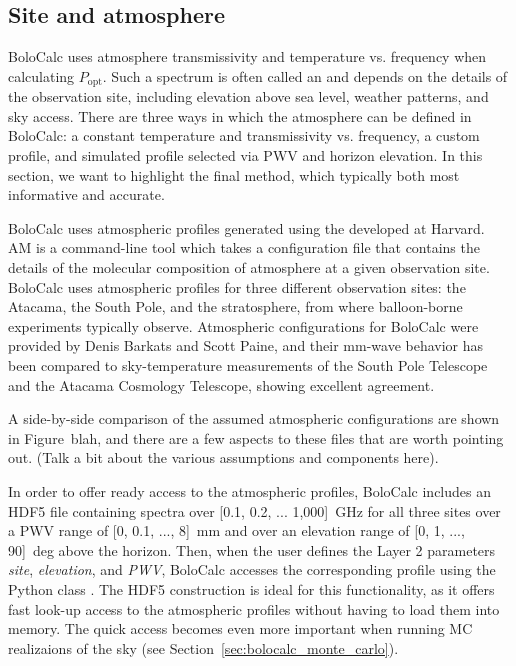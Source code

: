 
\subsection{Site and atmosphere}
\label{sec:bolocalc_site_atmosphere}

BoloCalc uses atmosphere transmissivity and temperature vs. frequency when calculating $P_{\mathrm{opt}}$. Such a spectrum is often called an  and depends on the details of the observation site, including elevation above sea level, weather patterns, and sky access. There are three ways in which the atmosphere can be defined in BoloCalc: a constant temperature and transmissivity vs. frequency, a custom profile, and simulated profile selected via PWV and horizon elevation. In this section, we want to highlight the final method, which typically both most informative and accurate.

BoloCalc uses atmospheric profiles generated using the  developed at Harvard. AM is a  command-line tool which takes a configuration file that contains the details of the molecular composition of atmosphere at a given observation site. BoloCalc uses atmospheric profiles for three different observation sites: the Atacama, the South Pole, and the stratosphere, from where balloon-borne experiments typically observe. Atmospheric configurations for BoloCalc were provided by Denis Barkats and Scott Paine, and their mm-wave behavior has been compared to sky-temperature measurements of the South Pole Telescope and the Atacama Cosmology Telescope, showing excellent agreement. 

A side-by-side comparison of the assumed atmospheric configurations are shown in Figure~blah, and there are a few aspects to these files that are worth pointing out. (Talk a bit about the various assumptions and components here).

In order to offer ready access to the atmospheric profiles, BoloCalc includes an HDF5 file containing spectra over [0.1, 0.2, ... 1,000]~GHz for all three sites over a PWV range of [0, 0.1, ..., 8]~mm and over an elevation range of [0, 1, ..., 90]~deg above the horizon. Then, when the user defines the Layer 2 parameters \textit{site}, \textit{elevation}, and \textit{PWV}, BoloCalc accesses the corresponding profile using the Python class . The HDF5 construction is ideal for this functionality, as it offers fast look-up access to the atmospheric profiles without having to load them into memory. The quick access becomes even more important when running MC realizaions of the sky (see Section~\ref{sec:bolocalc_monte_carlo}).

